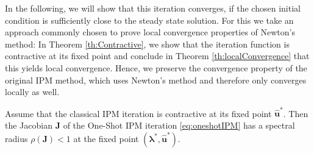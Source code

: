 In the following, we will show that this iteration converges, if the chosen initial condition is sufficiently close to the steady state solution. For this we take an approach commonly chosen to prove local convergence properties of Newton's method: In Theorem \ref{th:Contractive}, we show that the iteration function is contractive at its fixed point and conclude in Theorem \ref{th:localConvergence} that this yields local convergence. Hence, we preserve the convergence property of the original IPM method, which uses Newton's method and therefore only converges locally as well.
\begin{theorem}\label{th:Contractive}
Assume that the classical IPM iteration is contractive at its fixed point $\bm{\hat u}^*$. Then the Jacobian $\bm{J}$ of the One-Shot IPM iteration \eqref{eq:oneshotIPM} has a spectral radius $\rho(\bm{J})<1$ at the fixed point $(\bm{\lambda}^*,\bm{\hat u}^*)$.
\end{theorem}
